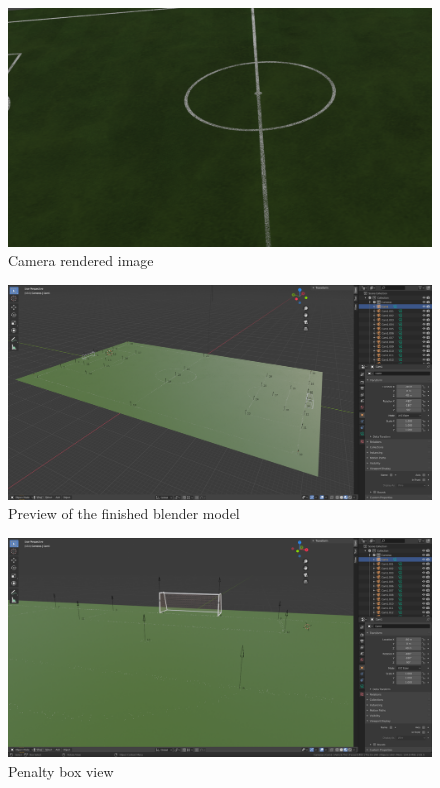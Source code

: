 \documentclass[
    11pt,
    oneside
]{report}
\begin{document}
\begin{appendices}
\begin{figure}[H]
    \includegraphics[keepaspectratio, width=\columnwidth]{image.png}
    \caption{Camera rendered image}
    \label{img:camera_view}
\end{figure}


\begin{figure}[H]
    \includegraphics[keepaspectratio, width=\columnwidth]{Screenshot_2022-03-05_12-03-42.png}
    \caption{Preview of the finished blender model}
    \label{img:blender_preview}
\end{figure}


\begin{figure}[H]
    \includegraphics[keepaspectratio, width=\columnwidth]{Screenshot_2022-03-05_12-45-59.png}
    \caption{Penalty box view}
    \label{img:penalty_box}
\end{figure}



\end{appendices}
\end{document}
